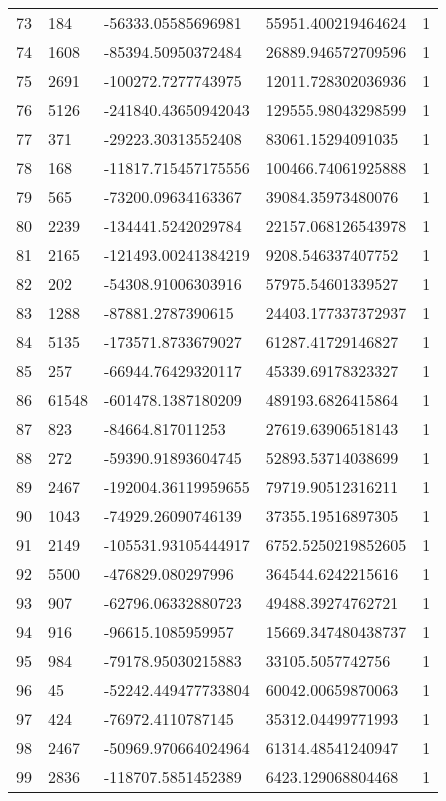 \begin{longtable}{lllll}
    73 & 184 & -56333.05585696981 & 55951.400219464624 & 1 \\
    74 & 1608 & -85394.50950372484 & 26889.946572709596 & 1 \\
    75 & 2691 & -100272.7277743975 & 12011.728302036936 & 1 \\
    76 & 5126 & -241840.43650942043 & 129555.98043298599 & 1 \\
    77 & 371 & -29223.30313552408 & 83061.15294091035 & 1 \\
    78 & 168 & -11817.715457175556 & 100466.74061925888 & 1 \\
    79 & 565 & -73200.09634163367 & 39084.35973480076 & 1 \\
    80 & 2239 & -134441.5242029784 & 22157.068126543978 & 1 \\
    81 & 2165 & -121493.00241384219 & 9208.546337407752 & 1 \\
    82 & 202 & -54308.91006303916 & 57975.54601339527 & 1 \\
    83 & 1288 & -87881.2787390615 & 24403.177337372937 & 1 \\
    84 & 5135 & -173571.8733679027 & 61287.41729146827 & 1 \\
    85 & 257 & -66944.76429320117 & 45339.69178323327 & 1 \\
    86 & 61548 & -601478.1387180209 & 489193.6826415864 & 1 \\
    87 & 823 & -84664.817011253 & 27619.63906518143 & 1 \\
    88 & 272 & -59390.91893604745 & 52893.53714038699 & 1 \\
    89 & 2467 & -192004.36119959655 & 79719.90512316211 & 1 \\
    90 & 1043 & -74929.26090746139 & 37355.19516897305 & 1 \\
    91 & 2149 & -105531.93105444917 & 6752.5250219852605 & 1 \\
    92 & 5500 & -476829.080297996 & 364544.6242215616 & 1 \\
    93 & 907 & -62796.06332880723 & 49488.39274762721 & 1 \\
    94 & 916 & -96615.1085959957 & 15669.347480438737 & 1 \\
    95 & 984 & -79178.95030215883 & 33105.5057742756 & 1 \\
    96 & 45 & -52242.449477733804 & 60042.00659870063 & 1 \\
    97 & 424 & -76972.4110787145 & 35312.04499771993 & 1 \\
    98 & 2467 & -50969.970664024964 & 61314.48541240947 & 1 \\
    99 & 2836 & -118707.5851452389 & 6423.129068804468 & 1
\end{longtable}
